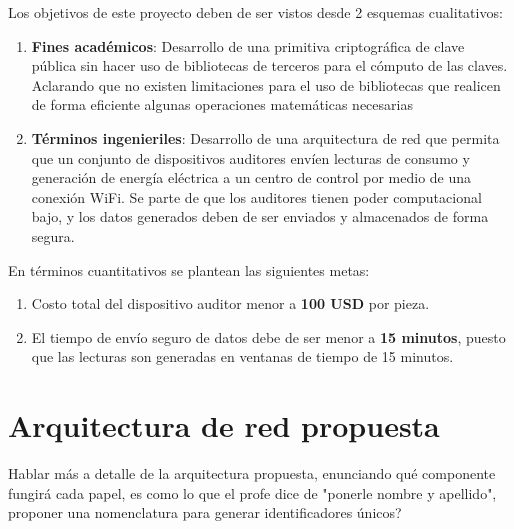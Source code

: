 \documentclass{article}
\begin{document}
        Los objetivos de este proyecto deben de ser vistos desde 2 esquemas cualitativos:
        \begin{enumerate}
            \item \textbf{Fines académicos}: Desarrollo de una primitiva criptográfica de clave pública sin hacer uso de bibliotecas de terceros para el cómputo de las claves. Aclarando que no existen limitaciones para el uso de bibliotecas que realicen de forma eficiente algunas operaciones matemáticas necesarias
            \item \textbf{Términos ingenieriles}: Desarrollo de una arquitectura de red que permita que un conjunto de dispositivos auditores envíen lecturas de consumo y generación de energía eléctrica a un centro de control por medio de una conexión WiFi. Se parte de que los auditores tienen poder computacional bajo, y los datos generados deben de ser enviados y almacenados de forma segura.
        \end{enumerate}

        En términos cuantitativos se plantean las siguientes metas:
        \begin{enumerate}
            \item Costo total del dispositivo auditor menor a \textbf{100 USD} por pieza.
            \item El tiempo de envío seguro de datos debe de ser menor a \textbf{15 minutos}, puesto que las lecturas son generadas en ventanas de tiempo de 15 minutos.
        \end{enumerate}

    \section{Arquitectura de red propuesta}

        Hablar más a detalle de la arquitectura propuesta, enunciando qué componente fungirá cada papel, es como lo que el profe dice de "ponerle nombre y apellido", proponer una nomenclatura para generar identificadores únicos?


\end{document}
